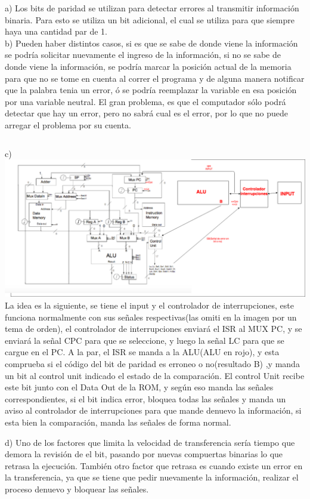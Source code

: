 \documentclass[letter]{article}
\begin{document}
	\begin{pregunta}{3}
	a) Los bits de paridad se utilizan para detectar   errores al transmitir información binaria. Para esto se utiliza un bit adicional, el cual se utiliza para que siempre haya una cantidad par de 1. 
	$$ $$
    b) Pueden haber distintos casos, si es que se sabe de donde viene la información se podría solicitar nuevamente el ingreso de la información, si no se sabe de donde viene la información, se podría marcar la posición actual de la memoria para que no se tome en cuenta al correr el programa y de alguna manera notificar que la palabra tenia un error, ó se podría reemplazar la variable en esa posición por una variable neutral. El gran problema, es que el computador sólo podrá detectar que hay un error, pero no sabrá cual es el error, por lo que no puede arregar el problema por su cuenta.
    
    $$ $$
    
    c)
    $$ $$
    {\includegraphics[width=15cm]{arquitectura.png}}
     $$ $$
    La idea es la siguiente, se tiene el input y el controlador de interrupciones, este funciona normalmente con sus señales respectivas(las omiti en la imagen por un tema de orden), el controlador de interrupciones enviará el ISR al MUX PC, y se enviará la señal CPC para que se seleccione, y luego la señal LC para que se cargue en el PC. A la par, el ISR se manda a la ALU(ALU en rojo), y esta comprueba si el código del bit de paridad es erroneo o no(resultado B) ,y manda un bit al control unit indicado el estado de la comparación. El control Unit recibe este bit junto con el Data Out de la ROM, y según eso manda las señales correspondientes, si el bit indica error, bloquea todas las señales y manda un aviso al controlador de interrupciones para que mande denuevo la información, si esta bien la comparación, manda las señales de forma normal.
    $$ $$
    
    d) Uno de los  factores que limita la velocidad de transferencia sería tiempo que demora la revisión de el bit, pasando por nuevas compuertas binarias lo que retrasa la ejecución. También otro factor que retrasa es cuando existe un error en la transferencia, ya que se tiene que pedir nuevamente la información, realizar el proceso denuevo y bloquear las señales.
    
    
	\end{pregunta}
\end{document}

